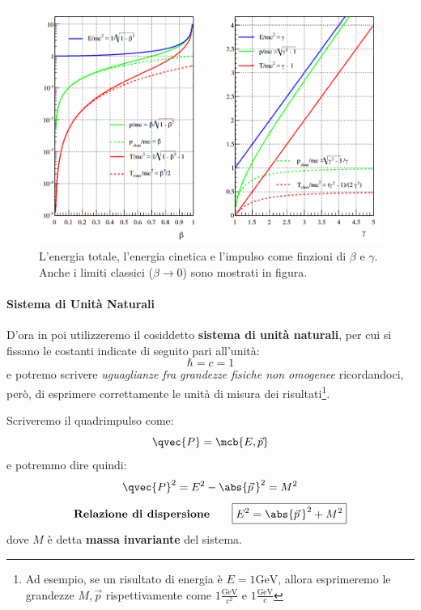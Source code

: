 \begin{figure}[ht]
  \centering
  \includegraphics[scale=0.4]{./img/2020_03_20/realtivity_lectures.png}
  \caption{L’energia totale, l’energia cinetica e l’impulso come finzioni di
  $\beta$ e $\gamma$. Anche i limiti classici ($\beta\to 0$) sono mostrati in
  figura.}
\end{figure}

\paragraph{Sistema di Unità Naturali}
D'ora in poi utilizzeremo il cosiddetto \textbf{sistema di unità naturali}, per
cui si fissano le costanti indicate di seguito pari all'unità:
\begin{equation}
  \boxed{\hbar = c = 1}
\end{equation}
e potremo scrivere \textit{uguaglianze fra grandezze fisiche non omogenee}
ricordandoci, però, di esprimere correttamente le unità di misura dei
risultati\footnote{
  Ad esempio, se un risultato di energia è $E = 1\si{\GeV}$, allora esprimeremo
  le grandezze $M,\vec{p}$ rispettivamente come $1\frac{\si{\GeV}}{c^2}$ e
  $1\frac{\si{\GeV}}{c}$
}.

Scriveremo il quadrimpulso come:
\begin{equation}
  \qvec{P} = \mcb{E,\vec{p}}
\end{equation}
e potremmo dire quindi:
\begin{equation}
  \qvec{P}^2 = E^2-\abs{\vec{p}\,}^2 = M^2
\end{equation}
\begin{equation}
  \textbf{Relazione di dispersione}
  \qquad
  \boxed{
    E^2 = \abs{\vec{p}\,}^2 + M^2
  }
\end{equation}
dove $M$ è detta \textbf{massa invariante} del sistema.

